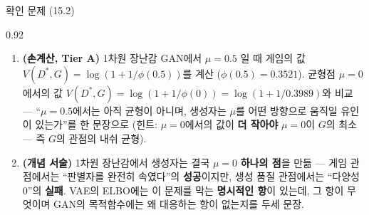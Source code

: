 \begin{frame}{확인 문제 (15.2)}
\begin{center}\begin{varwidth}{0.92\textwidth}
  \begin{enumerate}
    \item \textbf{(손계산, Tier A)} 1차원 장난감 GAN에서 $\mu = 0.5$
      일 때 게임의 값 $V(D^*, G) = \log(1 + 1/\phi(0.5))$를 계산
      ($\phi(0.5) = 0.3521$). 균형점 $\mu = 0$에서의 값
      $V(D^*, G) = \log(1 + 1/\phi(0)) = \log(1 + 1/0.3989)$와
      비교 — ``$\mu = 0.5$에서는 아직 균형이 아니며, 생성자는
      $\mu$를 어떤 방향으로 움직일 유인이 있는가''를 한 문장으로
      (힌트: $\mu = 0$에서의 값이 \textbf{더 작아야} $\mu = 0$이
      $G$의 최소 — 즉 $G$의 관점의 내쉬 균형).
    \item \textbf{(개념 서술)} 1차원 장난감에서 생성자는 결국
      $\mu = 0$ \textbf{하나의 점}을 만듦 — 게임 관점에서는
      ``판별자를 완전히 속였다''의 \textbf{성공}이지만, 생성
      품질 관점에서는 ``다양성 0''의 \textbf{실패}. VAE의 ELBO에는
      이 문제를 막는 \textbf{명시적인 항}이 있는데, 그 항이 무엇이며
      GAN의 목적함수에는 왜 대응하는 항이 없는지를 두세 문장.
  \end{enumerate}
\end{varwidth}\end{center}
\end{frame}
